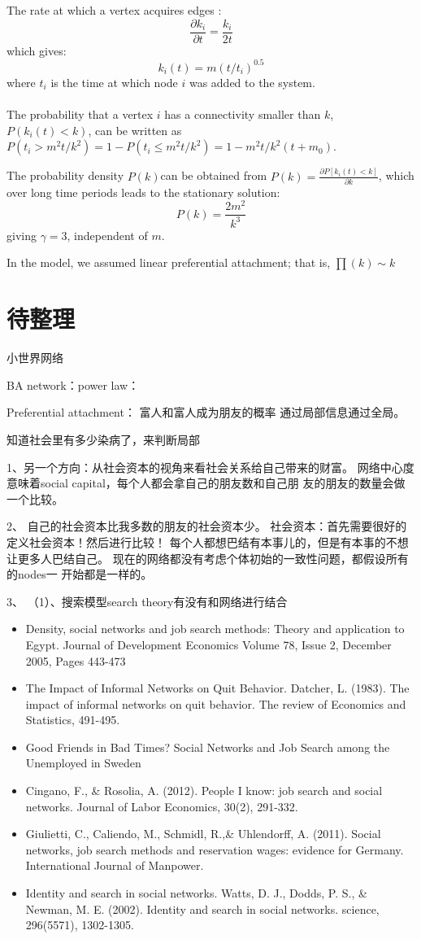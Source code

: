 \documentclass[a4paper]{article}
\begin{document}
The rate at which a vertex acquires edges :
\[\frac{\partial k_i}{\partial t}=\frac{k_i}{2t}\]
which gives:
\[k_i(t)=m(t/t_i)^{0.5}\]
where $t_i$ is the time at which node $i$ was added to the system.
\paragraph{}
The probability that a vertex $i $ has a connectivity smaller than $k$,
$P(k_i(t)<k)$, can be written as $P(t_i>m^2t/k^2)=1-P( t_i \leq m^2t/k^2 )=1-m^2t/k^2(t+m_0)$.

The probability density $P(k) $can be obtained from $P(k)=
\frac{\partial P[k_i(t)<k]}{\partial k}$, which over long
time periods leads to the stationary solution:
\[P(k)=\frac{2m^2}{k^3}\]
giving $\gamma=3$, independent of $m$.

In the model, we assumed linear preferential attachment; that is,
$\prod (k)\sim k$


\section{待整理}
小世界网络

BA network：power law：

Preferential  attachment：
富人和富人成为朋友的概率
通过局部信息通过全局。

知道社会里有多少染病了，来判断局部


1、另一个方向：从社会资本的视角来看社会关系给自己带来的财富。
网络中心度意味着social capital，每个人都会拿自己的朋友数和自己朋
友的朋友的数量会做一个比较。

2、
自己的社会资本比我多数的朋友的社会资本少。
社会资本：首先需要很好的定义社会资本！然后进行比较！
每个人都想巴结有本事儿的，但是有本事的不想让更多人巴结自己。
现在的网络都没有考虑个体初始的一致性问题，都假设所有的nodes一
开始都是一样的。


3、
（1）、搜索模型search theory有没有和网络进行结合
\begin{itemize}
	\item Density, social networks and job search methods: Theory and application to Egypt.
	Journal of Development Economics Volume 78, Issue 2, December 2005, Pages 443-473
	
	\item The Impact of Informal Networks on Quit Behavior. Datcher, L. (1983). The impact of informal networks on quit behavior. The review of Economics and Statistics, 491-495.
	\item Good Friends in Bad Times? Social Networks and Job Search among the Unemployed in Sweden
	\item Cingano, F., \& Rosolia, A. (2012). People I know: job search and social networks. Journal of Labor Economics, 30(2), 291-332.
	\item Giulietti, C., Caliendo, M., Schmidl, R.,\& Uhlendorff, A. (2011). Social networks, job search methods and reservation wages: evidence for Germany. International Journal of Manpower.
	\item Identity and search in social networks. Watts, D. J., Dodds, P. S., \& Newman, M. E. (2002). Identity and search in social networks. science, 296(5571), 1302-1305.
\end{itemize}
\end{document}
